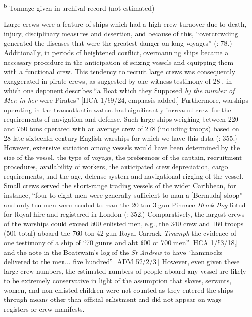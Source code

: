 \textsuperscript{b} Tonnage given in archival record (not estimated)

Large crews were a feature of ships which had a high crew turnover due to death, injury, disciplinary measures and desertion, and because of this, “overcrowding generated the diseases that were the greatest danger on long voyages” (\citealt{Bicheno2012}: 78.) Additionally, in periods of heightened conflict, overmanning ships became a necessary procedure in the anticipation of seizing vessels and equipping them with a functional crew. This tendency to recruit large crews was consequently exaggerated in pirate crews, as suggested by one witness testimony of 28 \citealt{March1722}, in which one deponent describes “a Boat which they Supposed \textit{by the number of Men in her} were Pirates” [HCA 1/99/24, emphasis added.] Furthermore, warships operating in the transatlantic waters had significantly increased crew for the requirements of navigation and defense. Such large ships weighing between 220 and 760 tons operated with an average crew of 278 (including troops) based on 28 late sixteenth-century English warships for which we have this data (\citealt{Bicheno2012}: 355.) However, extensive variation among vessels would have been determined by the size of the vessel, the type of voyage, the preferences of the captain, recruitment procedures, availability of workers, the anticipated crew depreciation, cargo requirements, and the age, defense system and navigational rigging of the vessel. Small crews served the short-range trading vessels of the wider Caribbean, for instance, “four to eight men were generally sufficient to man a [Bermuda] sloop” \citep[123]{Jarvis2010} and only ten men were needed to man the 20-ton 3-gun Pinnace \textit{Black Dog} listed for Royal hire and registered in London (\citealt{Bicheno2012}: 352.) Comparatively, the largest crews of the warships could exceed 500 enlisted men, e.g., the 340 crew and 160 troops (500 total) aboard the 760-ton 42-gun Royal Carrack \textit{Triumph} \citep[355,]{Bicheno2012} the evidence of one testimony of a ship of “70 gunns and abt 600 or 700 men” [HCA 1/53/18,] and the note in the Boatswain’s log of the \textit{St Andrew} to have “hammocks delivered to the men... five hundred” [ADM 52/2/3.] However, even given these large crew numbers, the estimated numbers of people aboard any vessel are likely to be extremely conservative in light of the assumption that slaves, servants, women, and non-enlisted children were not counted as they entered the ships through means other than official enlistment and did not appear on wage registers or crew manifests. 

